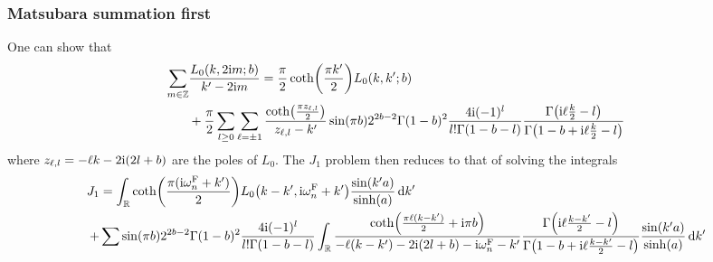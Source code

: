 \documentclass[english, parskip=full]{scrartcl}
\begin{document}
\subsubsection{Matsubara summation first}
One can show that
\begin{align}
\sum_{m\in\mathbb{Z}} &\frac{L_0(k,2\i m; b)}{k' - 2\i m} = \frac{\pi}{2} \coth\kla*{\frac{\pi k'}{2}} L_0(k,k'; b) \\
&+ \frac{\pi }{2} \sum_{l\ge 0} \sum_{\ell=\pm 1} \frac{\coth\kla*{\frac{\pi z_{\ell,l}}{2}}}{z_{\ell,l}-k'} \sin(\pi b) 2^{2b-2} \Gamma(1-b)^2 \frac{4\i (-1)^l}{l! \Gamma(1-b-l)} \frac{\Gamma\kla*{\i\ell \frac{k}{2} - l}}{\Gamma\kla*{1-b+\i\ell \frac{k}{2} - l}}
\end{align}
where $z_{\ell,l} =-\ell k - 2\text{i}(2l+b)$ are the poles of $L_0$.
The $J_1$ problem then reduces to that of solving the integrals
\begin{align}
J_1 &= \intr{\coth\kla*{\frac{\pi (\i\omega_n^\F + k')}{2}} L_0\kla*{k-k',\i\omega_n^\F + k'} \frac{\sin(k'a)}{\sinh(a)}}{k'}\\
+ &\sum \sin(\pi b) 2^{2b-2} \Gamma(1-b)^2 \frac{4\i (-1)^l}{l! \Gamma(1-b-l)} \intr{ \frac{\coth\kla*{\frac{\pi \ell (k-k')}{2} + \i\pi b}}{-\ell (k-k') - 2\i (2l+b) - \i\omega_n^\F - k'} \frac{\Gamma\kla*{\i\ell \frac{k-k'}{2} - l}}{\Gamma\kla*{1-b+\i\ell \frac{k-k'}{2} - l}}  \frac{\sin(k'a)}{\sinh(a)} }{k'}
\end{align}
\end{document}
